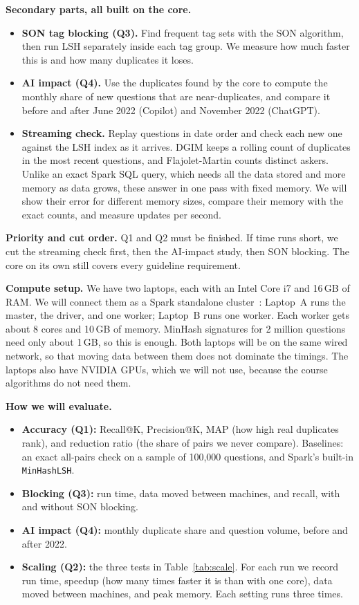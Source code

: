 \documentclass[11pt,a4paper]{article}
\begin{document}
\textbf{Secondary parts, all built on the core.}
\begin{itemize}
  \item \textbf{SON tag blocking (Q3).} Find frequent tag sets with the SON
        algorithm, then run LSH separately inside each tag group. We measure
        how much faster this is and how many duplicates it loses.
  \item \textbf{AI impact (Q4).} Use the duplicates found by the core to
        compute the monthly share of new questions that are near-duplicates,
        and compare it before and after June 2022 (Copilot) and November 2022
        (ChatGPT).
  \item \textbf{Streaming check.} Replay questions in date order and check each
        new one against the LSH index as it arrives. DGIM keeps a rolling count
        of duplicates in the most recent questions, and Flajolet-Martin counts
        distinct askers. Unlike an exact Spark SQL query, which needs all the
        data stored and more memory as data grows, these answer in one pass
        with fixed memory. We will show their error for different memory sizes,
        compare their memory with the exact counts, and measure updates per
        second.
\end{itemize}

\textbf{Priority and cut order.} Q1 and Q2 must be finished. If time runs
short, we cut the streaming check first, then the AI-impact study, then SON
blocking. The core on its own still covers every guideline requirement.

\textbf{Compute setup.} We have two laptops, each with an Intel Core i7 and
16\,GB of RAM. We will connect them as a Spark standalone
cluster~\cite{zaharia2012}: Laptop~A runs the master, the driver, and one
worker; Laptop~B runs one worker. Each worker gets about 8 cores and 10\,GB of
memory. MinHash signatures for 2 million questions need only about 1\,GB, so
this is enough. Both laptops will be on the same wired network, so that moving
data between them does not dominate the timings. The laptops also have NVIDIA
GPUs, which we will not use, because the course algorithms do not need them.

\textbf{How we will evaluate.}
\begin{itemize}
  \item \textbf{Accuracy (Q1):} Recall@K, Precision@K, MAP (how high real
        duplicates rank), and reduction ratio (the share of pairs we never
        compare). Baselines: an exact all-pairs check on a sample of 100{,}000
        questions, and Spark's built-in \texttt{MinHashLSH}.
  \item \textbf{Blocking (Q3):} run time, data moved between machines, and
        recall, with and without SON blocking.
  \item \textbf{AI impact (Q4):} monthly duplicate share and question volume,
        before and after 2022.
  \item \textbf{Scaling (Q2):} the three tests in Table~\ref{tab:scale}. For
        each run we record run time, speedup (how many times faster it is than
        with one core), data moved between machines, and peak memory. Each
        setting runs three times.
\end{itemize}
\end{document}
